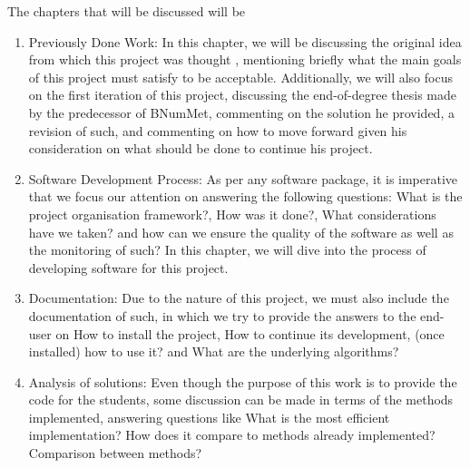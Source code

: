 The chapters that will be discussed will be
\begin{enumerate}
    \item Previously Done Work:
        In this chapter, we will be discussing the original idea from which this project was thought , mentioning briefly what the main goals of this project must satisfy to be acceptable. Additionally, we will also focus on the first iteration of this project, discussing the end-of-degree thesis made by the predecessor of BNumMet, commenting on the solution he provided, a revision of such, and commenting on how to move forward given his consideration on what should be done to continue his project.    
    \item Software Development Process:
    As per any software package, it is imperative that we focus our attention on answering the following questions: What is the project organisation framework?, How was it done?, What considerations have we taken? and how can we ensure the quality of the software as well as the monitoring of such? In this chapter, we will dive into the process of developing software for this project. 
    
    \item Documentation:
    Due to the nature of this project, we must also include the documentation of such, in which we try to provide the answers to the end-user on How to install the project, How to continue its development, (once installed) how to use it? and What are the underlying algorithms?

    \item Analysis of solutions:
    Even though the purpose of this work is to provide the code for the students, some discussion can be made in terms of the methods implemented, answering questions like What is the most efficient implementation? How does it compare to methods already implemented? Comparison between methods? 
\end{enumerate}
